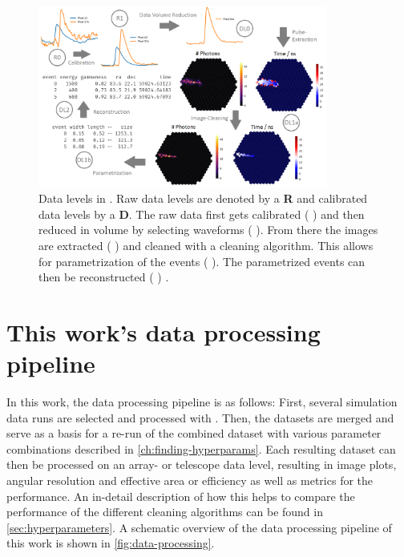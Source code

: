 \begin{figure}
    \centering
    \includegraphics[width=0.85\textwidth]{graphics/ctapipe.png}
    \caption{Data levels in \ctapipe{}. Raw data levels are denoted by a \textbf{R} and calibrated
    data levels by a \textbf{D}. The raw data first gets calibrated (\rzero{} \rightarrow \rone{})
    and then reduced in volume by selecting waveforms (\rone{} \rightarrow \dlz{}). From there the
    images are extracted (\dlz{} \rightarrow \dloa{}) and cleaned with a cleaning algorithm. This
    allows for parametrization of the events (\dloa{} \rightarrow \dlob{}). The parametrized events
    can then be reconstructed (\dlob{} \rightarrow \dlt{}) \cite{noethe_thesis, hackfeld}.}
    \label{fig:ctapipe}
\end{figure}

\section{This work's data processing pipeline}
\label{sec:pipeline}

In this work, the data processing pipeline is as follows: First, several simulation data runs are
selected and processed with \ctapipe{}. Then, the datasets are merged and serve as a basis for a re-run
of the combined dataset with various parameter combinations described in \autoref{ch:finding-hyperparams}.
Each resulting dataset can then be processed on an array- or telescope data level, resulting in
\dloa{} image plots, angular resolution and effective area or efficiency as well as metrics for the
performance. An in-detail description of how this helps to compare the performance of the different
cleaning algorithms can be found in \autoref{sec:hyperparameters}. A schematic overview of the data
processing pipeline of this work is shown in \autoref{fig:data-processing}.


